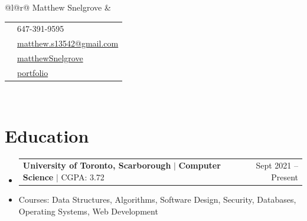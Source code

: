 \documentclass[letterpaper,12pt]{article}
\makeatletter
\newcommand{\resumeItem}[1]{
  \item\small{
    {#1 \vspace{-2pt}}
  }
}
\newcommand{\resumeEducationHeading}[4]{
  \vspace{-0pt}\item
    \begin{tabular*}{1\textwidth}[t]{l@{\extracolsep{\fill}}r}
      \textbf{#1} $|$ \textbf{#2} $|$ #3 & #4 \\
    \end{tabular*}\vspace{-7pt}
}
\newcommand{\resumeSubHeadingListStart}{\begin{itemize}[leftmargin=0in, label={}]}
\newcommand{\resumeSubHeadingListEnd}{\end{itemize}}
\makeatother
\begin{document}
\begin{tabular*}{\textwidth}{@{}l@{\extracolsep{\fill}}r@{}}
  {\fontsize{40}{40}\selectfont Matthew Snelgrove} & %
  \begin{tabular}{rl} %
      \large \faPhone & \hspace{0.5em} \large {647-391-9595} \\
      \large \href{mailto:matthew.s13542@gmail.com} \faEnvelope & \hspace{0.5em} \large \href{mailto:matthew.s13542@gmail.com}{matthew.s13542@gmail.com} \\
      \large \href{https://github.com/matthewSnelgrove/} \faGithub & \hspace{0.5em} \large \href{https://github.com/matthewSnelgrove/}{matthewSnelgrove} \\
      \large \href{https://matthewsnelgrove.github.io/portfolio} \faLink & \hspace{0.5em} \large \href{https://matthewsnelgrove.github.io/portfolio}{portfolio} \\
  \end{tabular} \\
\end{tabular*}




\vspace{-1em} %


\section{Education}
  \resumeSubHeadingListStart
    \resumeEducationHeading
      {University of Toronto, Scarborough}{Computer Science}{CGPA: 3.72}{Sept 2021 -- Present}
      \resumeItem{Courses: Data Structures, Algorithms, Software Design, Security, Databases, Operating Systems, Web Development}
  \resumeSubHeadingListEnd
\end{document}
